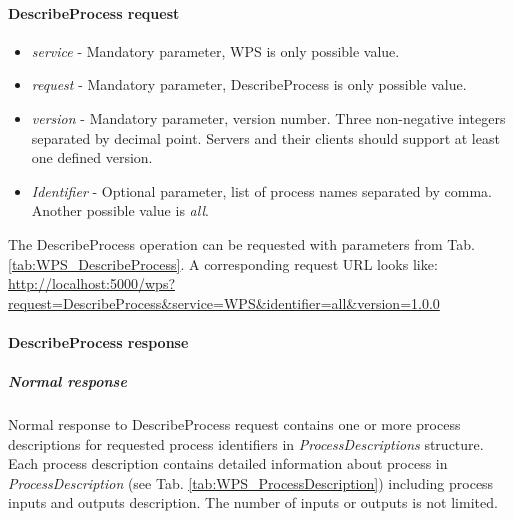 \paragraph{DescribeProcess request}
\begin{itemize}
\item\textit{service} - Mandatory parameter, WPS is only possible value.
\item\textit{request} - Mandatory parameter, DescribeProcess is only possible value.
\item\textit{version} - Mandatory parameter, version number. Three non-negative integers separated by decimal point. Servers and
their clients should support at least one defined version.
\item\textit{Identifier} - Optional parameter, list of process names separated by comma. Another possible value is \textit{all}.
\end{itemize}

The DescribeProcess operation can be requested with parameters from Tab. \ref{tab:WPS_DescribeProcess}. A corresponding
request URL looks like: \url{http://localhost:5000/wps?request=DescribeProcess&service=WPS&identifier=all&version=1.0.0}

\paragraph{DescribeProcess response}
\label{para:DesribeProc_response}

\subparagraph{Normal response}
Normal response to DescribeProcess request contains one or more process descriptions for requested process identifiers in 
\textit{ProcessDescriptions} structure. Each
process description contains detailed information about process in \textit{ProcessDescription} (see Tab. \ref{tab:WPS_ProcessDescription})
including process inputs and outputs description. The number of inputs or outputs is not limited.

